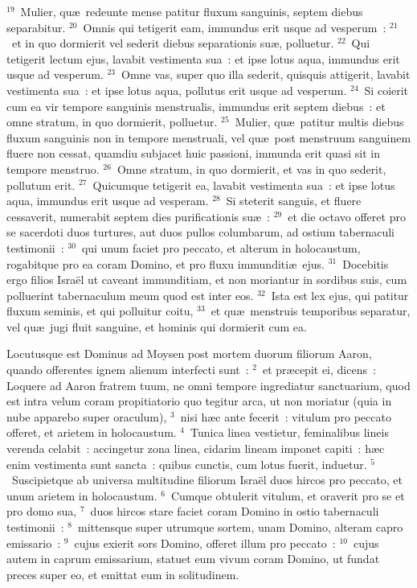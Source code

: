 ${}^{19}$~Mulier, qu\ae\ redeunte mense patitur fluxum sanguinis, septem diebus separabitur.
${}^{20}$~Omnis qui tetigerit eam, immundus erit usque ad vesperum~:
${}^{21}$~et in quo dormierit vel sederit diebus separationis su\ae , polluetur.
${}^{22}$~Qui tetigerit lectum ejus, lavabit vestimenta sua~: et ipse lotus aqua, immundus erit usque ad vesperum.
${}^{23}$~Omne vas, super quo illa sederit, quisquis attigerit, lavabit vestimenta sua~: et ipse lotus aqua, pollutus erit usque ad vesperum.
${}^{24}$~Si coierit cum ea vir tempore sanguinis menstrualis, immundus erit septem diebus~: et omne stratum, in quo dormierit, polluetur.
${}^{25}$~Mulier, qu\ae\ patitur multis diebus fluxum sanguinis non in tempore menstruali, vel qu\ae\ post menstruum sanguinem fluere non cessat, quamdiu subjacet huic passioni, immunda erit quasi sit in tempore menstruo.
${}^{26}$~Omne stratum, in quo dormierit, et vas in quo sederit, pollutum erit.
${}^{27}$~Quicumque tetigerit ea, lavabit vestimenta sua~: et ipse lotus aqua, immundus erit usque ad vesperam.
${}^{28}$~Si steterit sanguis, et fluere cessaverit, numerabit septem dies purificationis su\ae~:
${}^{29}$~et die octavo offeret pro se sacerdoti duos turtures, aut duos pullos columbarum, ad ostium tabernaculi testimonii~:
${}^{30}$~qui unum faciet pro peccato, et alterum in holocaustum, rogabitque pro ea coram Domino, et pro fluxu immunditi\ae\ ejus.
${}^{31}$~Docebitis ergo filios Isra\"el ut caveant immunditiam, et non moriantur in sordibus suis, cum polluerint tabernaculum meum quod est inter eos.
${}^{32}$~Ista est lex ejus, qui patitur fluxum seminis, et qui polluitur coitu,
${}^{33}$~et qu\ae\ menstruis temporibus separatur, vel qu\ae\ jugi fluit sanguine, et hominis qui dormierit cum ea.

\lettrine[lines=3,image=true,loversize=0.05,lraise=-0.03]{L}{}ocutusque est Dominus ad Moysen post mortem duorum filiorum Aaron, quando offerentes ignem alienum interfecti sunt~:
${}^{2}$~et pr\ae cepit ei, dicens~: Loquere ad Aaron fratrem tuum, ne omni tempore ingrediatur sanctuarium, quod est intra velum coram propitiatorio quo tegitur arca, ut non moriatur (quia in nube apparebo super oraculum),
${}^{3}$~nisi h\ae c ante fecerit~: vitulum pro peccato offeret, et arietem in holocaustum.
${}^{4}$~Tunica linea vestietur, feminalibus lineis verenda celabit~: accingetur zona linea, cidarim lineam imponet capiti~: h\ae c enim vestimenta sunt sancta~: quibus cunctis, cum lotus fuerit, induetur.
${}^{5}$~Suscipietque ab universa multitudine filiorum Isra\"el duos hircos pro peccato, et unum arietem in holocaustum.
${}^{6}$~Cumque obtulerit vitulum, et oraverit pro se et pro domo sua,
${}^{7}$~duos hircos stare faciet coram Domino in ostio tabernaculi testimonii~:
${}^{8}$~mittensque super utrumque sortem, unam Domino, alteram capro emissario~:
${}^{9}$~cujus exierit sors Domino, offeret illum pro peccato~:
${}^{10}$~cujus autem in caprum emissarium, statuet eum vivum coram Domino, ut fundat preces super eo, et emittat eum in solitudinem.


